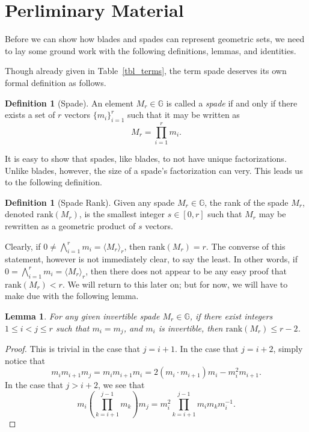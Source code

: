 \documentclass{birkjour}
\newtheorem{lem}[thm]{Lemma}
\theoremstyle{definition}
\newtheorem{defn}[thm]{Definition}
\theoremstyle{remark}
\numberwithin{equation}{section}
\newcommand{\G}{\mathbb{G}}
\newcommand{\rank}{\mbox{rank}}
\begin{document}
\section{Perliminary Material}

Before we can show how blades and spades can represent geometric sets, we need to lay some ground work
with the following definitions, lemmas, and identities.

Though already given in Table~\ref{tbl_terms}, the term spade deserves its own formal definition as follows.
\begin{defn}[Spade]
An element $M_r\in\G$ is called a \emph{spade} if and only if there exists a set of $r$ vectors $\{m_i\}_{i=1}^r$
such that it may be written as
\begin{equation}\label{equ_M_r}
M_r = \prod_{i=1}^r m_i.
\end{equation}
\end{defn}
It is easy to show that spades, like blades, to not have unique factorizations.  Unlike blades, however, the
size of a spade's factorization can very.  This leads us to the following definition.
\begin{defn}[Spade Rank]
Given any spade $M_r\in\G$, the rank of the spade $M_r$, denoted $\rank(M_r)$, is the
smallest integer $s\in[0,r]$ such that $M_r$ may be rewritten as a geometric product of $s$ vectors.
\end{defn}
Clearly, if $0\neq\bigwedge_{i=1}^r m_i=\langle M_r\rangle_r$, then $\rank(M_r)=r$.
The converse of this statement, however is not immediately clear, to say the least.
In other words, if $0=\bigwedge_{i=1}^r m_i=\langle M_r\rangle_r$, then there does not
appear to be any easy proof that $\rank(M_r)<r$.  We will return to this later on; but for now, we will have to make due with the following lemma.
\begin{lem}\label{lem_spade_no_dup_in_factorization}
For any given invertible spade $M_r\in\G$, if there exist integers $1\leq i<j\leq r$ such that $m_i=m_j$, and $m_i$ is invertible, then $\rank(M_r)\leq r-2$.
\end{lem}
\begin{proof}
This is trivial in the case that $j=i+1$.  In the case that $j=i+2$, simply notice that
\begin{equation*}
m_im_{i+1}m_j = m_im_{i+1}m_i = 2(m_i\cdot m_{i+1})m_i-m_i^2 m_{i+1}.
\end{equation*}
In the case that $j>i+2$, we see that
\begin{equation*}
m_i\left(\prod_{k=i+1}^{j-1}m_k\right)m_j = m_i^2\prod_{k=i+1}^{j-1}m_im_km_i^{-1}.
\end{equation*}
\end{proof}
\end{document}
